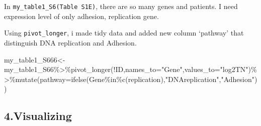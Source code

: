 \documentclass[
]{article}
\newenvironment{Shaded}{\begin{snugshade}}{\end{snugshade}}
\newcommand{\AttributeTok}[1]{\textcolor[rgb]{0.77,0.63,0.00}{#1}}
\newcommand{\DecValTok}[1]{\textcolor[rgb]{0.00,0.00,0.81}{#1}}
\newcommand{\FunctionTok}[1]{\textcolor[rgb]{0.00,0.00,0.00}{#1}}
\newcommand{\NormalTok}[1]{#1}
\newcommand{\OtherTok}[1]{\textcolor[rgb]{0.56,0.35,0.01}{#1}}
\newcommand{\SpecialCharTok}[1]{\textcolor[rgb]{0.00,0.00,0.00}{#1}}
\newcommand{\StringTok}[1]{\textcolor[rgb]{0.31,0.60,0.02}{#1}}
\begin{document}
In \texttt{my\_table1\_S6(Table\ S1E)}, there are so many genes and
patients. I need expression level of only adhesion, replication gene.

\begin{Shaded}
\end{Shaded}

Using \texttt{pivot\_longer}, i made tidy data and added new column
`pathway' that distinguish DNA replication and Adhesion.

\begin{Shaded}
\begin{Highlighting}[]
\NormalTok{my\_table1\_S666}\OtherTok{\textless{}{-}}\NormalTok{my\_table1\_S66}\SpecialCharTok{\%\textgreater{}\%}\FunctionTok{pivot\_longer}\NormalTok{(}\SpecialCharTok{!}\NormalTok{ID,}\AttributeTok{names\_to=}\StringTok{"Gene"}\NormalTok{,}\AttributeTok{values\_to=}\StringTok{"log2TN"}\NormalTok{)}\SpecialCharTok{\%\textgreater{}\%}\FunctionTok{mutate}\NormalTok{(}\AttributeTok{pathway=}\FunctionTok{ifelse}\NormalTok{(Gene}\SpecialCharTok{\%in\%}\FunctionTok{c}\NormalTok{(replication),}\StringTok{"DNAreplication"}\NormalTok{,}\StringTok{"Adhesion"}\NormalTok{))}
\end{Highlighting}
\end{Shaded}

\hypertarget{visualizing}{%
\subsection{4.Visualizing}\label{visualizing}}
\end{document}
